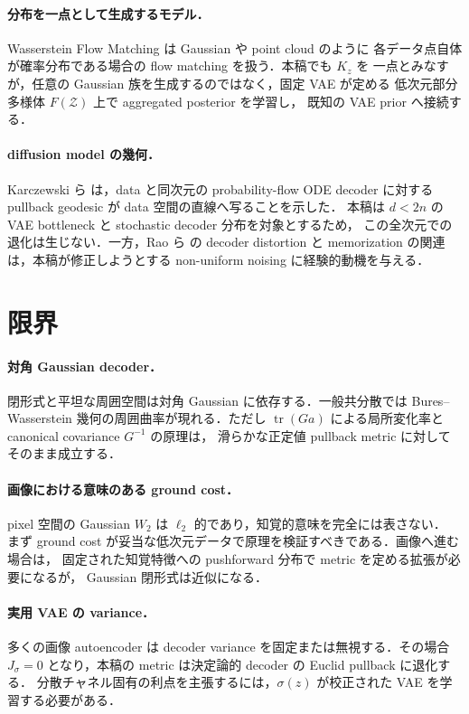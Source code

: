 \documentclass[uplatex,dvipdfmx,11pt,a4paper]{jsarticle}
\begin{document}
\paragraph{分布を一点として生成するモデル．}
Wasserstein Flow Matching \cite{haviv2026} は Gaussian や point cloud のように
各データ点自体が確率分布である場合の flow matching を扱う．本稿でも $K_z$ を
一点とみなすが，任意の Gaussian 族を生成するのではなく，固定 VAE が定める
低次元部分多様体 $F(\mathcal{Z})$ 上で aggregated posterior を学習し，
既知の VAE prior へ接続する．

\paragraph{diffusion model の幾何．}
Karczewski ら \cite{karczewski2026} は，data と同次元の probability-flow ODE
decoder に対する pullback geodesic が data 空間の直線へ写ることを示した．
本稿は $d<2n$ の VAE bottleneck と stochastic decoder 分布を対象とするため，
この全次元での退化は生じない．一方，Rao ら \cite{rao2026} の
decoder distortion と memorization の関連は，本稿が修正しようとする
non-uniform noising に経験的動機を与える．

\section{限界}
\label{sec:limitations}

\paragraph{対角 Gaussian decoder．}
閉形式と平坦な周囲空間は対角 Gaussian に依存する．一般共分散では
Bures--Wasserstein 幾何の周囲曲率が現れる．ただし
$\operatorname{tr}(Ga)$ による局所変化率と canonical covariance $G^{-1}$ の原理は，
滑らかな正定値 pullback metric に対してそのまま成立する．

\paragraph{画像における意味のある ground cost．}
pixel 空間の Gaussian $W_2$ は $\ell_2$ 的であり，知覚的意味を完全には表さない．
まず ground cost が妥当な低次元データで原理を検証すべきである．画像へ進む場合は，
固定された知覚特徴への pushforward 分布で metric を定める拡張が必要になるが，
Gaussian 閉形式は近似になる．

\paragraph{実用 VAE の variance．}
多くの画像 autoencoder は decoder variance を固定または無視する．その場合
$J_\sigma=0$ となり，本稿の metric は決定論的 decoder の Euclid pullback に退化する．
分散チャネル固有の利点を主張するには，$\sigma(z)$ が校正された VAE を学習する必要がある．
\end{document}
